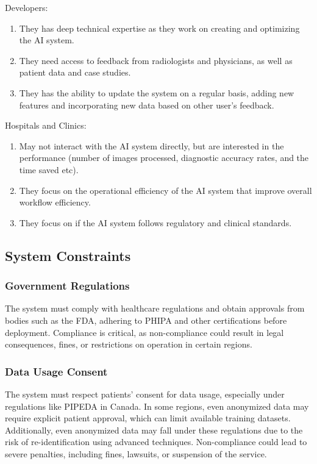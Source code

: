 \documentclass[12pt]{article}
\begin{document}
Developers:
 \begin{enumerate}
 \item They has deep technical expertise as they work on creating and optimizing the AI system.
 \item They need access to feedback from radiologists and physicians, as well as patient data and case studies. 
 \item They has the ability to update the system on a regular basis, adding new features and incorporating new data based on other user's feedback.
 \end{enumerate}
Hospitals and Clinics:
 \begin{enumerate}
 \item May not interact with the AI system directly, but are interested in the performance (number of images processed, diagnostic accuracy rates, and the time saved etc). 
 \item They focus on the operational efficiency of the AI system that improve overall workflow efficiency.
 \item They focus on if the AI system follows regulatory and clinical standards. 
 \end{enumerate}
\subsection{System Constraints}

\subsubsection{Government Regulations}
The system must comply with healthcare regulations and obtain approvals from bodies such as the FDA, adhering to PHIPA and other certifications before deployment. Compliance is critical, as non-compliance could result in legal consequences, fines, or restrictions on operation in certain regions.

\subsubsection{Data Usage Consent}
The system must respect patients' consent for data usage, especially under regulations like PIPEDA in Canada. In some regions, even anonymized data may require explicit patient approval, which can limit available training datasets. Additionally, even anonymized data may fall under these regulations due to the risk of re-identification using advanced techniques. Non-compliance could lead to severe penalties, including fines, lawsuits, or suspension of the service.
\end{document}
